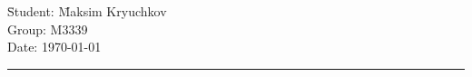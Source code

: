 \begin{tabbing}
\hspace{11cm} \= Student: \= Maksim Kryuchkov \\
  \> Group: \> M3339 \\
  \> Date: \> \today
\end{tabbing}
\hrule
\vspace{1cm}

